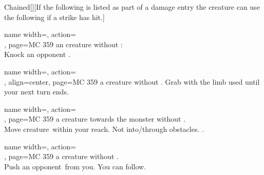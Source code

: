 \begin{PageFront}
    \begin{Table}{Chained}[][If the following is listed as part of a damage entry the creature can use the following if a strike has hit.]
        \begin{entry}{}{%
            name width=\monsterLength,%
            action={  \\},
            page={MC 359}
        }
             an creature without : \\\AthleticsReflex \dash Knock an opponent \Prone. \quad{}
        \end{entry}
        \begin{entry}{}{%
            name width=\monsterLength,%
            action={ \\},
            align=center,
            page={MC 359}
        }
             a creature without . \AthleticsFortitude \dash Grab with the limb used until your next turn ends.\hfill
            \\
            \hfill
        \end{entry}
        \begin{entry}{}{%
            name width=\monsterLength,%
            action={ \\},
            page={MC 359}
        }
             a creature towards the monster without .\\ \AthleticsFortitude \dash Move creature \,\Feet within your reach. Not into/through obstacles.\hfill
            .
        \end{entry}
        \begin{entry}{}{%
            name width=\monsterLength,%
            action={ \\},
            page={MC 359}
        }
             a creature without .\\ \AthleticsFortitude \dash Push an opponent \,\Feet from you. You can follow. \hfill

\end{entry}
\end{Table}
\end{PageFront}
